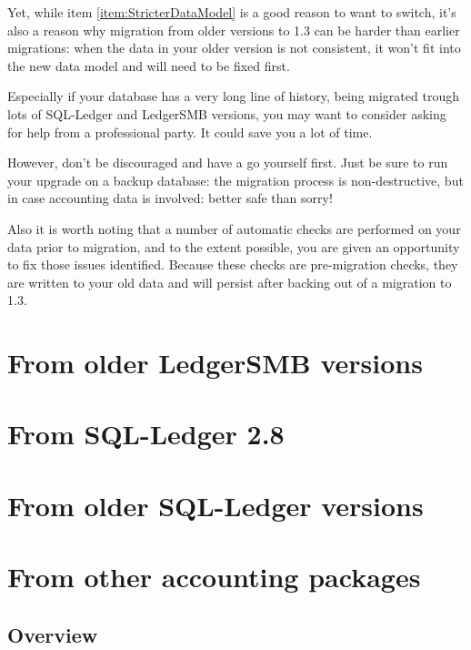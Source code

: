 Yet, while item \ref{item:StricterDataModel} is a good reason to want to switch, it's
also a reason why migration from older versions to 1.3 can be harder than earlier
migrations: when the data
in your older version is not consistent, it won't fit into the new data model and
will need to be fixed first.

Especially if your database has a very long line of history, being migrated trough
lots of SQL-Ledger and LedgerSMB versions, you may want to consider asking for help
from a professional party. It could save you a lot of time.

However, don't be discouraged and have a go yourself first. Just be sure to run
your upgrade on a backup database: the migration process is non-destructive, but
in case accounting data is involved: better safe than sorry!

Also it is worth noting that a number of automatic checks are performed on your
data prior to migration, and to the extent possible, you are given an
opportunity to fix those issues identified.  Because these checks are
pre-migration checks, they are written to your old data and will persist after
backing out of a migration to 1.3.

\section{From older LedgerSMB versions}
\label{sec-migration-from-older-ledgersmb}

\section{From SQL-Ledger 2.8}
\label{sec-migration-from-sql-ledger-28}

\section{From older SQL-Ledger versions}
\label{sec-migration-from-older-sql-ledger}

\section{From other accounting packages}
\label{sec-migration-from-other-accounting-systems}

\subsection{Overview}





